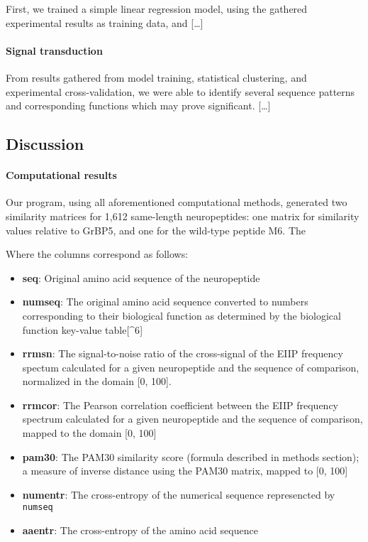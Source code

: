 \documentclass[]{article}
\providecommand{\tightlist}{%
  \setlength{\itemsep}{0pt}\setlength{\parskip}{0pt}}
\let\oldparagraph\paragraph
\renewcommand{\paragraph}[1]{\oldparagraph{#1}\mbox{}}
\begin{document}
First, we trained a simple linear regression model, using the gathered
experimental results as training data, and {[}\ldots{}{]}

\hypertarget{signal-transduction}{%
\paragraph{Signal transduction}\label{signal-transduction}}

From results gathered from model training, statistical clustering, and experimental cross-validation, we were able to identify several sequence patterns and corresponding functions which may prove significant.
{[}\ldots{}{]}

\hypertarget{discussion}{%
\subsection{Discussion}\label{discussion}}

\hypertarget{computational-results}{%
\paragraph{Computational results}\label{computational-results}}

Our program, using all aforementioned computational methods, generated two similarity matrices for 1,612 same-length neuropeptides: one matrix for similarity values relative to GrBP5, and one for the wild-type peptide M6. The






Where the columns correspond as follows:

\begin{itemize}
\tightlist
\item
  \textbf{seq}: Original amino acid sequence of the neuropeptide
\item
  \textbf{numseq}: The original amino acid sequence converted to numbers
  corresponding to their biological function as determined by the
  biological function key-value table{[}\^{}6{]}
\item
  \textbf{rrmsn}: The signal-to-noise ratio of the cross-signal of the
  EIIP frequency spectum calculated for a given neuropeptide and the
  sequence of comparison, normalized in the domain {[}0, 100{]}.
\item
  \textbf{rrmcor}: The Pearson correlation coefficient between the EIIP
  frequency spectrum calculated for a given neuropeptide and the
  sequence of comparison, mapped to the domain {[}0, 100{]}
\item
  \textbf{pam30}: The PAM30 similarity score (formula described in
  methods section); a measure of inverse distance using the PAM30
  matrix, mapped to {[}0, 100{]}
\item
  \textbf{numentr}: The cross-entropy of the numerical sequence
  represencted by \texttt{numseq}
\item
  \textbf{aaentr}: The cross-entropy of the amino acid sequence
\end{itemize}
\end{document}
